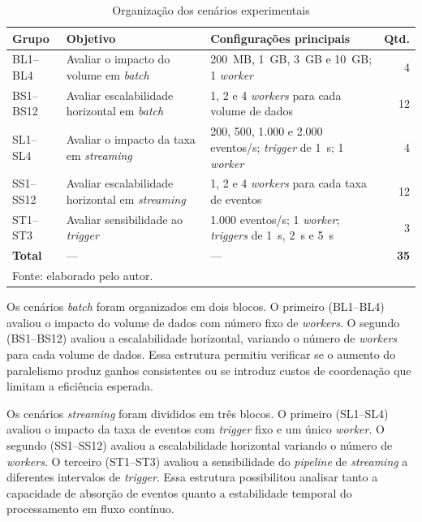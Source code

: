 \begin{table}[htbp]
\centering
\caption{Organização dos cenários experimentais}
\label{tab:cenarios-experimentais}
\footnotesize
\setlength{\tabcolsep}{5pt}
\renewcommand{\arraystretch}{1.30}
\begin{tabular}{l p{3.8cm} p{6.0cm} r}
\toprule
\textbf{Grupo} & \textbf{Objetivo} & \textbf{Configurações principais} & \textbf{Qtd.} \\
\midrule
BL1--BL4  & Avaliar o impacto do volume em \textit{batch}           & 200~MB, 1~GB, 3~GB e 10~GB; 1 \textit{worker}                              & 4  \\
BS1--BS12 & Avaliar escalabilidade horizontal em \textit{batch}     & 1, 2 e 4 \textit{workers} para cada volume de dados                        & 12 \\
SL1--SL4  & Avaliar o impacto da taxa em \textit{streaming}         & 200, 500, 1.000 e 2.000 eventos/s; \textit{trigger} de 1~s; 1 \textit{worker} & 4  \\
SS1--SS12 & Avaliar escalabilidade horizontal em \textit{streaming} & 1, 2 e 4 \textit{workers} para cada taxa de eventos                        & 12 \\
ST1--ST3  & Avaliar sensibilidade ao \textit{trigger}               & 1.000 eventos/s; 1 \textit{worker}; \textit{triggers} de 1~s, 2~s e 5~s   & 3  \\
\midrule
\textbf{Total} & --- & --- & \textbf{35} \\
\bottomrule
\multicolumn{4}{l}{\footnotesize Fonte: elaborado pelo autor.}
\end{tabular}
\end{table}
 
Os cenários \textit{batch} foram organizados em dois blocos. O primeiro (BL1--BL4) avaliou o impacto do volume de dados com número fixo de \textit{workers}. O segundo (BS1--BS12) avaliou a escalabilidade horizontal, variando o número de \textit{workers} para cada volume de dados. Essa estrutura permitiu verificar se o aumento do paralelismo produz ganhos consistentes ou se introduz custos de coordenação que limitam a eficiência esperada.
 
Os cenários \textit{streaming} foram divididos em três blocos. O primeiro (SL1--SL4) avaliou o impacto da taxa de eventos com \textit{trigger} fixo e um único \textit{worker}. O segundo (SS1--SS12) avaliou a escalabilidade horizontal variando o número de \textit{workers}. O terceiro (ST1--ST3) avaliou a sensibilidade do \textit{pipeline} de \textit{streaming} a diferentes intervalos de \textit{trigger}. Essa estrutura possibilitou analisar tanto a capacidade de absorção de eventos quanto a estabilidade temporal do processamento em fluxo contínuo.
 

